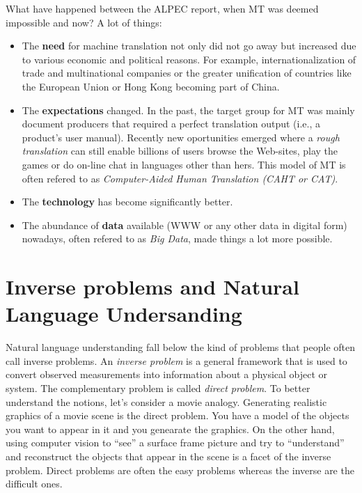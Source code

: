 \documentclass[a4paper,10pt]{report}
\begin{document}
What have happened between the ALPEC report, when MT was deemed impossible and now? A lot of things:
\begin{itemize}
 \item The \textbf{need} for machine translation not only did not go away but increased due to various economic and political reasons. For example, internationalization of trade and multinational companies or the greater unification of countries like the European Union or Hong Kong becoming part of China.
 \item The \textbf{expectations} changed. In the past, the target group for MT was mainly document producers that required a perfect translation output (i.e., a product's user manual). Recently new oportunities emerged where a \emph{rough translation} can still enable billions of users browse the Web-sites, play the games or do on-line chat in languages other than hers. This model of MT is often refered to as \emph{Computer-Aided Human Translation (CAHT or CAT)}.
  \item The \textbf{technology} has become significantly better.
 \item The abundance of \textbf{data} available (WWW or any other data in digital form) nowadays, often refered to as \emph{Big Data}, made things a lot more possible.
\end{itemize}

\section*{Inverse problems and Natural Language Undersanding}

Natural language understanding fall below the kind of problems that people often call inverse problems. An \emph{inverse problem} is a general framework that is used to convert observed measurements into information about a physical object or system. The complementary problem is called \emph{direct problem}. To better understand the notions, let's consider a movie analogy. Generating realistic graphics of a movie scene is the direct problem. You have a model of the objects you want to appear in it and you genearate the graphics. On the other hand, using computer vision to ``see'' a surface frame picture and try to ``understand'' and reconstruct the objects that appear in the scene is a facet of the inverse problem. Direct problems are often the easy problems whereas the inverse are the difficult ones.
\end{document}
